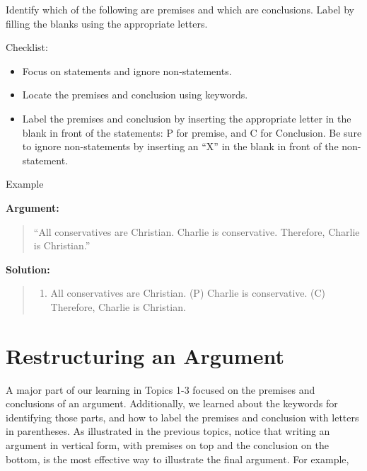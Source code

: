 \documentclass[
]{book}
\providecommand{\tightlist}{%
  \setlength{\itemsep}{0pt}\setlength{\parskip}{0pt}}
\begin{document}
\begin{reflect}
Identify which of the following are premises and which are conclusions. Label by filling the blanks using the appropriate letters.

{Checklist:}

\begin{itemize}
\tightlist
\item
  Focus on statements and ignore non-statements.\\
\item
  Locate the premises and conclusion using keywords.\\
\item
  Label the premises and conclusion by inserting the appropriate letter in the blank in front of the statements: P for premise, and C for Conclusion. Be sure to ignore non-statements by inserting an ``X'' in the blank in front of the non-statement.
\end{itemize}

{Example}

\textbf{Argument:}

\begin{quote}
``All conservatives are Christian. Charlie is conservative. Therefore, Charlie is Christian.''
\end{quote}

\textbf{Solution:}

\begin{quote}
\begin{enumerate}
\def\labelenumi{(\Alph{enumi})}
\setcounter{enumi}{15}
\tightlist
\item
  All conservatives are Christian. (P) Charlie is conservative. (C) Therefore, Charlie is Christian.
\end{enumerate}
\end{quote}
\end{reflect}

\hypertarget{restructuring-an-argument}{%
\section{Restructuring an Argument}\label{restructuring-an-argument}}

A major part of our learning in Topics 1-3 focused on the premises and conclusions of an argument. Additionally, we learned about the keywords for identifying those parts, and how to label the premises and conclusion with letters in parentheses. As illustrated in the previous topics, notice that writing an argument in vertical form, with premises on top and the conclusion on the bottom, is the most effective way to illustrate the final argument. For example,
\end{document}
